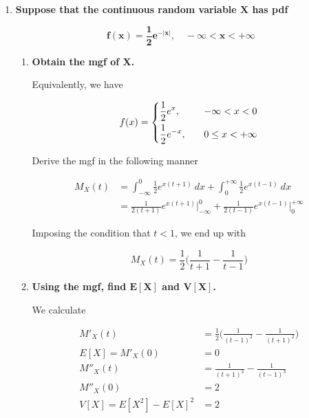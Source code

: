 \documentclass[10pt, oneside]{article}   	%
\theoremstyle{definition}
\begin{document}
\begin{enumerate}[label=10.\arabic*]
\item  \begin{tcolorbox}[
  colback=Cerulean!5!white,
  colframe=Cerulean!75!black]
\textbf{Suppose that the continuous random variable $\bm{X}$ has pdf}

\[ \bm{f(x) = \frac{1}{2} e^{-|x|}, \quad -\infty < x < +\infty} \]
\end{tcolorbox}

	\begin{enumerate}
	\item  \begin{tcolorbox}[
	  colback=Cerulean!5!white,
	  colframe=Cerulean!75!black]
	\textbf{Obtain the mgf of $\bm{X}$.}
	\end{tcolorbox}
	
	Equivalently, we have
	
	\[ f(x) = \begin{dcases}
	\frac{1}{2} e^x, & \quad -\infty < x < 0 \\
	\frac{1}{2} e^{-x}, & \quad 0 \leq x < +\infty
	\end{dcases}
	\]
	
	Derive the mgf in the following manner
	
	\begin{align*}
	M_X(t) &= \int^0_{-\infty} \frac{1}{2} e^{x(t+1)} \ dx + \int^{+\infty}_0 \frac{1}{2} e^{x(t-1)} \ dx \\
	&= \frac{1}{2(t+1)} e^{x(t+1)} \bigg|^0_{-\infty} + \frac{1}{2(t-1)} e^{x(t-1)} \bigg|^{+\infty}_0
	\end{align*}
	
	Imposing the condition that $t < 1$, we end up with
	
	\[ \boxed{ M_X(t) = \frac{1}{2} \bigg( \frac{1}{t+1} - \frac{1}{t-1} \bigg) } \]
	
	\item  \begin{tcolorbox}[
	  colback=Cerulean!5!white,
	  colframe=Cerulean!75!black]
	\textbf{Using the mgf, find $\bm{E[X]}$ and $\bm{V[X]}$.}
	\end{tcolorbox}
	
	We calculate
	
	\begin{align*}
	M'_X(t) &= \frac{1}{2} \bigg( \frac{1}{(t-1)^2} - \frac{1}{(t+1)^2} \bigg) \\
	E[X] = M'_X(0) &= \boxed{0} \\
	M''_X(t) &= \frac{1}{(t+1)^3} - \frac{1}{(t-1)^3} \\
	M''_X(0) &= 2 \\
	V[X] = E[X^2] - E[X]^2 &= \boxed{2}
	\end{align*}
	

\end{enumerate}
\end{enumerate}
\end{document}
